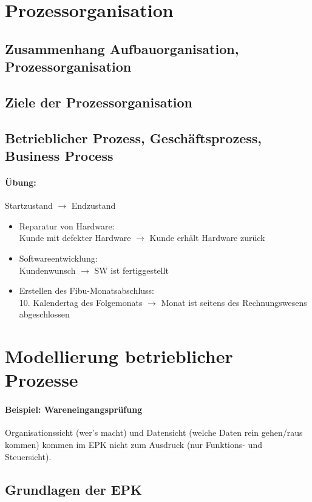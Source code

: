 \documentclass{scrreprt}
\begin{document}
\section{Prozessorganisation}
\subsection{Zusammenhang Aufbauorganisation, Prozessorganisation}
\subsection{Ziele der Prozessorganisation}
\subsection{Betrieblicher Prozess, Geschäftsprozess, Business Process}
\paragraph{Übung:}
Startzustand $\to$ Endzustand
\begin{itemize}
\item Reparatur von Hardware:\\
Kunde mit defekter Hardware $\to$ Kunde erhält Hardware zurück
\item Softwareentwicklung:\\
Kundenwunsch $\to$ SW ist fertiggestellt
\item Erstellen des Fibu-Monatsabschluss:\\
10. Kalendertag des Folgemonats $\to$ Monat ist seitens des Rechnungswesens abgeschlossen
\end{itemize}

\section{Modellierung betrieblicher Prozesse}
\paragraph{Beispiel: Wareneingangsprüfung}
Organisationssicht (wer's macht) und Datensicht (welche Daten rein gehen/raus kommen) kommen im EPK nicht zum Ausdruck (nur Funktions- und Steuersicht).
\subsection{Grundlagen der EPK}
\end{document}
